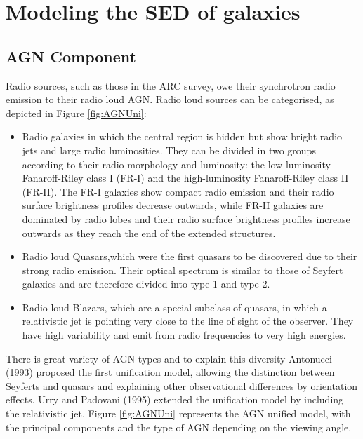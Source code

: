 
\section{Modeling the SED of galaxies} \label{sec:SEDmodelling}

\subsection{AGN Component}
Radio sources, such as those in the ARC survey, owe their synchrotron radio emission to their radio loud AGN. Radio loud sources can be categorised, as depicted in Figure \ref{fig:AGNUni}:
\begin{itemize}
    \item Radio galaxies in which the central region is hidden but show bright radio jets and large radio luminosities. They can be divided in two groups according to their radio morphology and luminosity: the low-luminosity Fanaroff-Riley class I (FR-I) and the high-luminosity Fanaroff-Riley class II (FR-II). The FR-I galaxies show compact radio emission and their radio surface brightness profiles decrease outwards, while FR-II galaxies are dominated by radio lobes and their radio surface brightness profiles increase outwards as they reach the end of the extended structures.
    \item Radio loud Quasars,which  were the first quasars to be discovered due to their strong radio emission. Their optical spectrum is similar to those of Seyfert galaxies and are therefore divided into type 1 and type 2.
    \item Radio loud Blazars, which are a special subclass of quasars, in which a relativistic jet is pointing very close to the line of sight of the observer. They have high variability and emit from radio frequencies to very high energies. 
\end{itemize}
There is great variety of AGN types and to explain this diversity Antonucci
(1993)\cite{Antonucci1993} proposed the first unification model, allowing the distinction
between Seyferts and quasars and explaining other observational differences by orientation effects. Urry and Padovani (1995)\cite{UrryPado1995} extended the unification model by including the relativistic jet. Figure \ref{fig:AGNUni} represents the AGN unified model, with the principal components and the type of AGN depending on the viewing angle. 


